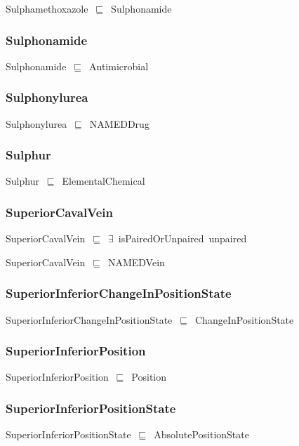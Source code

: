 \documentclass{article}
\begin{document}
Sulphamethoxazole~\ensuremath{\sqsubseteq}~Sulphonamide~

\subsubsection*{Sulphonamide}

Sulphonamide~\ensuremath{\sqsubseteq}~Antimicrobial~

\subsubsection*{Sulphonylurea}

Sulphonylurea~\ensuremath{\sqsubseteq}~NAMEDDrug~

\subsubsection*{Sulphur}

Sulphur~\ensuremath{\sqsubseteq}~ElementalChemical~

\subsubsection*{SuperiorCavalVein}

SuperiorCavalVein~\ensuremath{\sqsubseteq}~\ensuremath{\exists}~isPairedOrUnpaired~unpaired~

SuperiorCavalVein~\ensuremath{\sqsubseteq}~NAMEDVein~

\subsubsection*{SuperiorInferiorChangeInPositionState}

SuperiorInferiorChangeInPositionState~\ensuremath{\sqsubseteq}~ChangeInPositionState~

\subsubsection*{SuperiorInferiorPosition}

SuperiorInferiorPosition~\ensuremath{\sqsubseteq}~Position~

\subsubsection*{SuperiorInferiorPositionState}

SuperiorInferiorPositionState~\ensuremath{\sqsubseteq}~AbsolutePositionState~
\end{document}
